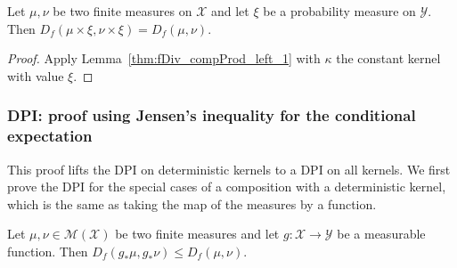 \begin{corollary}
  \label{cor:fDiv_prod_left_1}
  \leanok
  Let $\mu, \nu$ be two finite measures on $\mathcal X$ and let $\xi$ be a probability measure on $\mathcal Y$.
  Then $D_f(\mu \times \xi, \nu \times \xi) = D_f(\mu, \nu)$.
\end{corollary}

\begin{proof}\leanok
{}
Apply Lemma~\ref{thm:fDiv_compProd_left_1} with $\kappa$ the constant kernel with value $\xi$.
\end{proof}


\subsubsection{DPI: proof using Jensen's inequality for the conditional expectation}

This proof lifts the DPI on deterministic kernels to a DPI on all kernels.
We first prove the DPI for the special cases of a composition with a deterministic kernel, which is the same as taking the map of the measures by a function.

\begin{theorem}
  \label{thm:fDiv_map_le}
  \leanok
  Let $\mu, \nu \in \mathcal M (\mathcal X)$ be two finite measures and let $g : \mathcal X \to \mathcal Y$ be a measurable function. Then
  $D_f(g_* \mu, g_* \nu) \le D_f(\mu, \nu)$.
\end{theorem}

